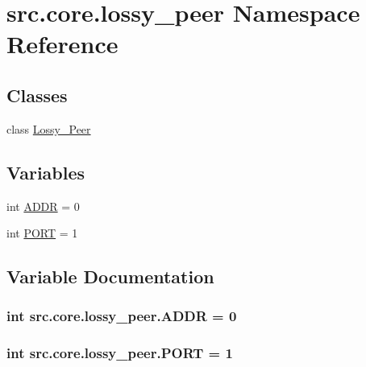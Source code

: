 \hypertarget{namespacesrc_1_1core_1_1lossy__peer}{}\section{src.\+core.\+lossy\+\_\+peer Namespace Reference}
\label{namespacesrc_1_1core_1_1lossy__peer}
\subsection*{Classes}
\begin{DoxyCompactItemize}
\item 
class \hyperlink{classsrc_1_1core_1_1lossy__peer_1_1Lossy__Peer}{Lossy\+\_\+\+Peer}
\end{DoxyCompactItemize}
\subsection*{Variables}
\begin{DoxyCompactItemize}
\item 
int \hyperlink{namespacesrc_1_1core_1_1lossy__peer_ab3bd3462e284ea0e2ccde3c1ceeef122}{A\+D\+D\+R} = 0
\item 
int \hyperlink{namespacesrc_1_1core_1_1lossy__peer_af5f04319788b80c1b1912b13b4b79a54}{P\+O\+R\+T} = 1
\end{DoxyCompactItemize}


\subsection{Variable Documentation}
\hypertarget{namespacesrc_1_1core_1_1lossy__peer_ab3bd3462e284ea0e2ccde3c1ceeef122}{}
\subsubsection[{A\+D\+D\+R}]{\setlength{\rightskip}{0pt plus 5cm}int src.\+core.\+lossy\+\_\+peer.\+A\+D\+D\+R = 0}\label{namespacesrc_1_1core_1_1lossy__peer_ab3bd3462e284ea0e2ccde3c1ceeef122}
\hypertarget{namespacesrc_1_1core_1_1lossy__peer_af5f04319788b80c1b1912b13b4b79a54}{}
\subsubsection[{P\+O\+R\+T}]{\setlength{\rightskip}{0pt plus 5cm}int src.\+core.\+lossy\+\_\+peer.\+P\+O\+R\+T = 1}\label{namespacesrc_1_1core_1_1lossy__peer_af5f04319788b80c1b1912b13b4b79a54}

